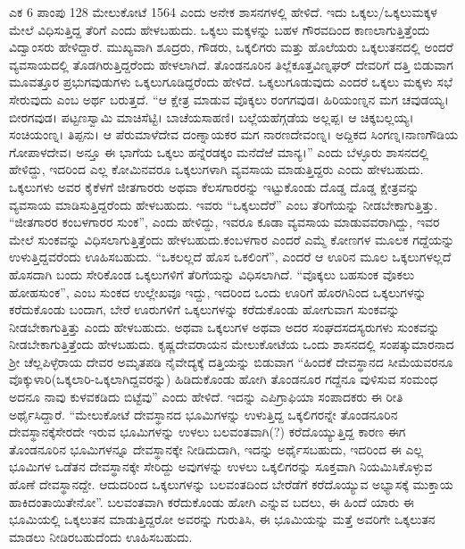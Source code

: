 {ಎಕ 6 ಪಾಂಪು 128 ಮೇಲುಕೋಟೆ 1564} ಎಂದು ಅನೇಕ ಶಾಸನಗಳಲ್ಲಿ ಹೇಳಿದೆ. ಇದು ಒಕ್ಕಲು/ಒಕ್ಕಲುಮಕ್ಕಳ ಮೇಲೆ ವಿಧಿಸುತ್ತಿದ್ದ ತೆರಿಗೆ ಎಂದು ಹೇಳಬಹುದು. ಒಕ್ಕಲು ಮಕ್ಕಳನ್ನು ಬಹಳ ಗೌರವದಿಂದ ಕಾಣಲಾಗುತ್ತಿತ್ತೆಂದು ವಿದ್ವಾಂಸರು ಹೇಳಿದ್ದಾರೆ. ಮುಖ್ಯವಾಗಿ ಶೂದ್ರರು, ಗೌಡರು, ಒಕ್ಕಲಿಗರು ಮತ್ತು ಹೊಲೆಯರು ಒಕ್ಕಲುತನದಲ್ಲಿ ಅಂದರೆ ವ್ಯವಸಾಯದಲ್ಲಿ ತೊಡಗಿರುತ್ತಿದ್ದರೆಂದು ಹೇಳಲಾಗಿದೆ. ತೊಂಡನೂರಿನ ತಿಲ್ಲೆಕೂತ್ತವಿಣ್ನಘರ್​ ದೇವರಿಗೆ ದತ್ತಿ ಬಿಡುವಾಗ ಮೂವತ್ತೂರ ಪ್ರಭುಗವುಡುಗಳು ಒಕ್ಕಲುಗೂಡಿದ್ದರೆಂದು ಹೇಳಿದೆ. ಒಕ್ಕಲುಗೂಡುವುದು ಎಂದರೆ ಒಕ್ಕಲು ಮಕ್ಕಳು ಸಭೆ ಸೇರುವುದು ಎಂಬ ಅರ್ಥ ಬರುತ್ತದೆ. “ಆ ಕ್ಷೇತ್ರ ಮಾಡುವ ವೊಕ್ಕಲು ರಂಗಗವುಡ। ಹಿರಿಯಂಣ್ನನ ಮಗ ಚವುಡಯ್ಯ। ಬೀರಗವುಡ। ಪಟ್ಟಣಸ್ವಾಮಿ ಮಾಚಿಸೆಟ್ಟಿ। ಬಾಚೆಯಸಾಹಣಿ। ಬಲ್ಲೆಯಹೆಗ್ಗಡೆಯ ಅಲ್ಲಪ್ಪ। ಆ ಚಿಕ್ಕಬಲ್ಲಯ್ಯ।ಸಂಚಿಯಂಣ್ನ। ತಿಪ್ಪನು। ಆ ಪೆರುಮಾಳೆದೇವ ದಂಣ್ನಾಯಕರ ಮಗ ನಾರಣದೇವಂಣ್ನ। ಅದ್ದಿಕದ ಸಿಂಗಣ್ನ।ನಾಣಗೌಡಿಯ ಗೋಪಾಳದೇವ। ಅನ್ತೂ ಈ ಭಾಗೆಯ ಒಕ್ಕಲು ಹನ್ನೆರಡಕ್ಕಂ ಮನೆದೆಱೆ ಮಾನ್ಯ।” ಎಂದು ಬೆಳ್ಳೂರು ಶಾಸನದಲ್ಲಿ ಹೇಳಿದ್ದು, ಇದರಿಂದ ಎಲ್ಲ ಕೋಮಿನವರೂ ಒಕ್ಕಲುಗಳಾಗಿ ವ್ಯವಸಾಯ ಮಾಡುತ್ತಿದ್ದರು ಎಂದು ಹೇಳಬಹುದು. ಒಕ್ಕಲುಗಳು ಅವರ ಕೈಕೆಳಗೆ ಜೀತಗಾರರು ಅಥವಾ ಕೆಲಸಗಾರರನ್ನು ಇಟ್ಟುಕೊಂಡು ದೊಡ್ಡ ದೊಡ್ಡ ಕ್ಷೇತ್ರವನ್ನು ವ್ಯವಸಾಯ ಮಾಡಿಸುತ್ತಿದ್ದರೆಂದು ಹೇಳಬಹುದು. ಇವರು “ಒಕ್ಕಲುದೆರೆ” ಎಂಬ ತೆರಿಗೆಯನ್ನು ನೀಡಬೇಕಾಗುತ್ತಿತ್ತು. “ಜೀತಗಾರರ ಕಂಬಳಗಾರರ ಸುಂಕ”, ಎಂದು ಹೇಳಿದ್ದು, ಇವರೂ ಕೂಡಾ ವ್ಯವಸಾಯ ಮಾಡುವವರಾಗಿದ್ದು, ಇವರ ಮೇಲೆ ಸುಂಕವನ್ನು ವಿಧಿಸಲಾಗುತ್ತಿತ್ತೆಂದು ಹೇಳಬಹುದು.\break ಕಂಬಳಗಾರ ಎಂದರೆ ಎಮ್ಮೆ ಕೋಣಗಳ ಮೂಲಕ ಗದ್ದೆಯನ್ನು ಉಳುತ್ತಿದ್ದವರೆಂದು ಊಹಿಸಬಹುದು. “ಒಕಲಲ್ಲದೆ ಹೊಸ ಒಕಲಿಂಗೆ”, ಎಂದರೆ ಆ ಊರಿನ ಮೂಲ ಒಕ್ಕಲುಗಳಲ್ಲದೆ ಹೊಸದಾಗಿ ಬಂದು ಸೇರಿಕೊಂಡ ಒಕ್ಕಲುಗಳಿಗೆ ತೆರಿಗೆಯನ್ನು ವಿಧಿಸಲಾಗಿದೆ. “ವೊಕ್ಕಲು ಬಹಸುಂಕ ವೊಕಲು ಹೋಹಸುಂಕ”, ಎಂಬ ಸುಂಕದ ಉಲ್ಲೇಖವೂ ಇದ್ದು, ಇದರಿಂದ ಒಂದು ಊರಿಗೆ ಹೊರಗಿನಿಂದ ಒಕ್ಕಲುಗಳನ್ನು ಕರೆದುಕೊಂಡು ಬಂದಾಗ, ಬೇರೆ ಊರುಗಳಿಗೆ ಒಕ್ಕಲುಗಳನ್ನು ಕರೆದುಕೊಂಡು ಹೋಗುವಾಗ ಸುಂಕವನ್ನು ನೀಡಬೇಕಾಗುತ್ತಿತ್ತು ಎಂದು ಹೇಳಬಹುದು. ಅಥವಾ ಒಕ್ಕಲುಗಳ ಅಥವಾ ಅದರ ಸಂಘದ\break ಸದಸ್ಯರುಗಳು ಸುಂಕವನ್ನು ನೀಡಬೇಕಾಗುತ್ತಿತ್ತೆಂದು ಹೇಳಬಹುದು. ಕೃಷ್ಣದೇವರಾಯನ ಮೇಲುಕೋಟೆಯ ಒಂದು ಶಾಸನದಲ್ಲಿ ಸಂಪತ್ಕುಮಾರನಾದ ಶ‍್ರೀ ಚೆಲ್ಲಪಿಳ್ಳೆರಾಯ ದೇವರ ಅಮೃತಪಡಿ ನೈವೇದ್ಯಕ್ಕೆ ದತ್ತಿಯನ್ನು ಬಿಡುವಾಗ “ಹಿಂದಕೆ ದೇವಸ್ಥಾನದ ಸೀಮೆಯವರನೂ ವೊಕ್ಕುಳಾರಿ(ಒಕ್ಕಲಾರಿ-ಒಕ್ಕಲಾಗಿದ್ದವರನ್ನು) ಹಿಡಿದುಕೊಂಡು ಹೋಗಿ ತೊಂಡನೂರ ಗದ್ದೆನೂ ವುಳಿಸುವ ಸಂಮಂಧ ಅದನೂ ನಾವು ಕುಳವಕಡಿದು ಬಿಟ್ಟೆವು” ಎಂದು ಹೇಳಿದೆ. ಇದನ್ನು ಎಪಿಗ್ರಾಫಿಯಾ ಸಂಪಾದಕರು ಈ ರೀತಿ ಅರ್ಥೈಸಿದ್ದಾರೆ. “ಮೇಲುಕೋಟೆ ದೇವಸ್ಥಾನದ ಭೂಮಿಗಳನ್ನು ಉಳುತ್ತಿದ್ದ ಒಕ್ಕಲಿಗರನ್ನೇ ತೊಂಡನೂರಿನ ದೇವಸ್ಥಾನಕ್ಕೆ\break ಸೇರದೇ ಇರುವ ಭೂಮಿಗಳನ್ನು ಉಳಲು ಬಲವಂತವಾಗಿ(?) ಕರೆದೊಯ್ಯುತ್ತಿದ್ದ ಕಾರಣ ಈಗ ತೊಂಡನೂರಿನ ಭೂಮಿಗಳನ್ನೂ ದೇವಸ್ಥಾನಕ್ಕೇ ನೀಡಿದುದಾಗಿ, ಇದನ್ನು ಅರ್ಥೈಸಬಹುದು, ಇದರಿಂದ ಈ ಎಲ್ಲ ಭೂಮಿಗಳ ಒಡೆತನ ದೇವಸ್ಥಾನಕ್ಕೇ ಸೇರಿದ್ದು ಅವುಗಳನ್ನು ಉಳಲು ಒಕ್ಕಲಿಗರನ್ನು ಸೂಕ್ತವಾಗಿ ನಿಯಮಿಸಿಕೊಳ್ಳುವ ಹೊಣೆ ದೇವಸ್ಥಾನದ್ದೇ. ಆದುದರಿಂದ ಒಕ್ಕಲುಗಳನ್ನು ಬಲವಂತದಿಂದ ಬೇರೆಡೆಗೆ ಕರೆದೊಯ್ಯುವ ಅಭ್ಯಾಸಕ್ಕೆ ಮುಕ್ತಾಯ ಹಾಕಿದಂತಾಯಿತೇನೋ”. ಬಲವಂತವಾಗಿ ಕರೆದುಕೊಂಡು ಹೋಗಿ ಎನ್ನುವ ಬದಲು, ಈ ಹಿಂದೆ ಯಾರು ಈ ಭೂಮಿಯಲ್ಲಿ ಒಕ್ಕಲುತನ ಮಾಡುತ್ತಿದ್ದರೋ ಅವರನ್ನು ಗುರುತಿಸಿ, ಈ ಭೂಮಿಯನ್ನು ಮತ್ತೆ ಅವರಿಗೇ ಒಕ್ಕಲುತನ ಮಾಡಲು ನೀಡಿರಬಹುದೆಂದು ಊಹಿಸಬಹುದು.

